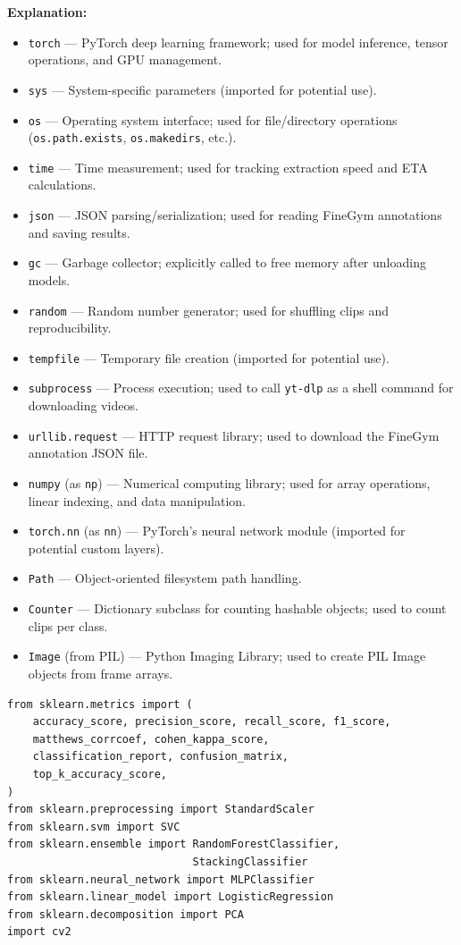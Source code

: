 \documentclass[a4paper, 12pt]{article}
\newenvironment{explanation}{%
  \par\smallskip
  \noindent\textcolor{blue!70!black}{\textbf{Explanation:}}\\
  \noindent
}{\par\medskip}
\begin{document}
\begin{explanation}
\begin{itemize}[nosep]
  \item \texttt{torch} --- PyTorch deep learning framework; used for model inference, tensor operations, and GPU management.
  \item \texttt{sys} --- System-specific parameters (imported for potential use).
  \item \texttt{os} --- Operating system interface; used for file/directory operations (\texttt{os.path.exists}, \texttt{os.makedirs}, etc.).
  \item \texttt{time} --- Time measurement; used for tracking extraction speed and ETA calculations.
  \item \texttt{json} --- JSON parsing/serialization; used for reading FineGym annotations and saving results.
  \item \texttt{gc} --- Garbage collector; explicitly called to free memory after unloading models.
  \item \texttt{random} --- Random number generator; used for shuffling clips and reproducibility.
  \item \texttt{tempfile} --- Temporary file creation (imported for potential use).
  \item \texttt{subprocess} --- Process execution; used to call \texttt{yt-dlp} as a shell command for downloading videos.
  \item \texttt{urllib.request} --- HTTP request library; used to download the FineGym annotation JSON file.
  \item \texttt{numpy} (as \texttt{np}) --- Numerical computing library; used for array operations, linear indexing, and data manipulation.
  \item \texttt{torch.nn} (as \texttt{nn}) --- PyTorch's neural network module (imported for potential custom layers).
  \item \texttt{Path} --- Object-oriented filesystem path handling.
  \item \texttt{Counter} --- Dictionary subclass for counting hashable objects; used to count clips per class.
  \item \texttt{Image} (from PIL) --- Python Imaging Library; used to create PIL Image objects from frame arrays.
\end{itemize}
\end{explanation}

\begin{lstlisting}
from sklearn.metrics import (
    accuracy_score, precision_score, recall_score, f1_score,
    matthews_corrcoef, cohen_kappa_score,
    classification_report, confusion_matrix,
    top_k_accuracy_score,
)
from sklearn.preprocessing import StandardScaler
from sklearn.svm import SVC
from sklearn.ensemble import RandomForestClassifier,
                             StackingClassifier
from sklearn.neural_network import MLPClassifier
from sklearn.linear_model import LogisticRegression
from sklearn.decomposition import PCA
import cv2
\end{lstlisting}
\end{document}

